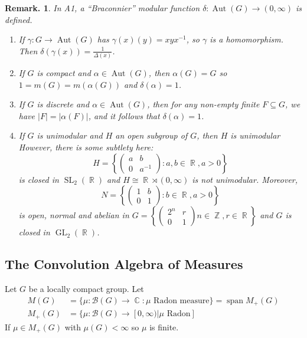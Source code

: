 \documentclass[11pt, a4paper]{memoir}
\DeclareMathOperator{\Z}{{\mathbb{Z}}}
\DeclareMathOperator{\R}{{\mathbb{R}}}
\DeclareMathOperator{\C}{{\mathbb{C}}}
\theoremstyle{change}
\theoremstyle{plain}
\theoremstyle{nonumberplain}
\newtheorem{remark}{Remark.}
\DeclareMathOperator{\Aut}{Aut}
\DeclareMathOperator{\GL}{GL}
\DeclareMathOperator{\SL}{SL}
\DeclareMathOperator{\spn}{span}
\numberwithin{equation}{section}
\begin{document}
\begin{remark}
    In A1, a ``Braconnier'' modular function $\delta:\Aut(G)\to(0,\infty)$ is defined.
    \begin{enumerate}[nl,r]
        \item If $\gamma:G\to\Aut(G)$ has $\gamma(x)(y)=xyx^{-1}$, so $\gamma$ is a homomorphism.
            Then $\delta(\gamma(x))=\frac{1}{\Delta(x)}$.
        \item If $G$ is compact and $\alpha\in\Aut(G)$, then $\alpha(G)=G$ so $1=m(G)=m(\alpha(G))$ and $\delta(\alpha)=1$.
        \item If $G$ is discrete and $\alpha\in\Aut(G)$, then for any non-empty finite $F\subseteq G$, we have $|F|=|\alpha(F)|$, and it follows that $\delta(\alpha)=1$.
        \item If $G$ is unimodular and $H$ an open subgroup of $G$, then $H$ is unimodular
            However, there is some subtlety here:
            \begin{equation*}
                H=\left\{\begin{pmatrix}a&b\\0&a^{-1}\end{pmatrix}:a,b\in\R,a>0\right\}
            \end{equation*}
            is closed in $\SL_2(\R)$ and $H\cong\R\rtimes(0,\infty)$ is not unimodular.
            Moreover,
            \begin{equation*}
                N=\left\{\begin{pmatrix}1&b\\0&1\end{pmatrix}:b\in\R,a>0\right\}
            \end{equation*}
            is open, normal and abelian in $G=\left\{\begin{pmatrix}2^n &r\\0&1\end{pmatrix}n\in\Z,r\in\R\right\}$ and $G$ is closed in $\GL_2(\R)$.
    \end{enumerate}
\end{remark}
\subsection{The Convolution Algebra of Measures}
Let $G$ be a locally compact group.
Let
\begin{align*}
    M(G) &= \{\mu:\mathcal{B}(G)\to\C:\mu\text{ Radon measure}\}=\spn M_+(G)\\
    M_+(G) &= \{\mu:\mathcal{B}(G)\to[0,\infty)|\mu\text{ Radon}]
\end{align*}
If $\mu\in M_+(G)$ with $\mu(G)<\infty$ so $\mu$ is finite.
\end{document}
